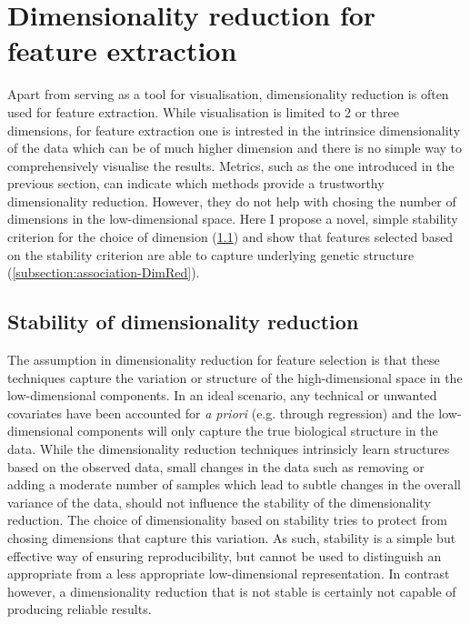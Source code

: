\section{Dimensionality reduction for feature extraction}
Apart from serving as a tool for visualisation, dimensionality reduction is often used for feature extraction. While visualisation is limited to \num{2} or three dimensions, for feature extraction one is intrested in the intrinsice dimensionality of the data which can be of much higher dimension and there is no simple way to comprehensively visualise the results. Metrics, such as the one introduced in the previous section, can indicate which methods provide a trustworthy dimensionality reduction. However, they do not help with chosing the number of dimensions in the low-dimensional space. Here I propose a novel, simple stability criterion for the choice of dimension (\cref{subsection:stability-DimRed}) and show that features selected based on the stability criterion are able to capture underlying genetic structure (\cref{subsection:association-DimRed}).

\subsection{Stability of dimensionality reduction}
\label{subsection:stability-DimRed}
The assumption in dimensionality reduction for feature selection is that these techniques capture the variation or structure of the high-dimensional space in the low-dimensional components. In an ideal scenario, any technical or unwanted covariates have been accounted for \textit{a priori} (e.g. through regression) and the low-dimensional components will only capture the true biological structure in the data. While the dimensionality reduction techniques intrinsicly learn structures based on the observed data, small changes in the data such as removing or adding a moderate number of samples which lead to subtle changes in the overall variance of the data, should not influence the stability of the dimensionality reduction. The choice of dimensionality based on stability tries to protect from chosing dimensions that capture this variation. As such, stability is a simple but effective way of ensuring reproducibility, but cannot be used to distinguish an appropriate from a less appropriate low-dimensional representation. In contrast however, a dimensionality reduction that is not stable is certainly not capable of producing reliable results.

